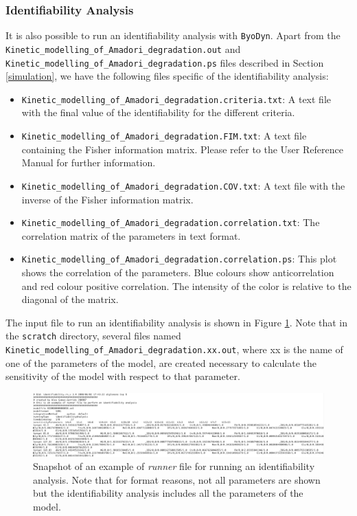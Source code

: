\documentclass[a4paper, 11pt]{article}
\begin{document}
  \subsubsection{Identifiability Analysis}
  It is also possible to run an identifiability analysis with \texttt{ByoDyn}.
  Apart from the \texttt{Kinetic\_modelling\_of\_Amadori\_degradation.out} and \\ \texttt{Kinetic\_modelling\_of\_Amadori\_degradation.ps} files described in Section \ref{simulation}, we have the following files specific of the identifiability analysis:
  \begin{itemize}
  \item \texttt{Kinetic\_modelling\_of\_Amadori\_degradation.criteria.txt}: A text file with the final value of the identifiability for the different criteria.
  \item \texttt{Kinetic\_modelling\_of\_Amadori\_degradation.FIM.txt}: A text file containing the Fisher information matrix. Please refer to the User Reference Manual for further information.
  \item \texttt{Kinetic\_modelling\_of\_Amadori\_degradation.COV.txt}: A text file with the inverse of the Fisher information matrix.
  \item \texttt{Kinetic\_modelling\_of\_Amadori\_degradation.correlation.txt}: The correlation matrix of the parameters in text format.
  \item \texttt{Kinetic\_modelling\_of\_Amadori\_degradation.correlation.ps}: This plot shows the correlation of the parameters.
    Blue colours show anticorrelation and red colour positive correlation.
    The intensity of the color is relative to the diagonal of the matrix.
  \end{itemize}
  The input file to run an identifiability analysis is shown in Figure \ref{identifiabilityRunner}.
  Note that in the \texttt{scratch} directory, several files named \\ \texttt{Kinetic\_modelling\_of\_Amadori\_degradation.xx.out}, where xx is the name of one of the parameters of the model, are created necessary to calculate the sensitivity of the model with respect to that parameter.
  \begin{figure}[t]
    \begin{center}
      \includegraphics[scale=.75]{figures/identifiabilityRunner.eps}
      \caption{
        Snapshot of an example of \emph{runner} file for running an identifiability analysis.
        Note that for format reasons, not all parameters are shown but the identifiability analysis includes all the parameters of the model.
      }
      \label{identifiabilityRunner}
    \end{center}
  \end{figure}
\end{document}
